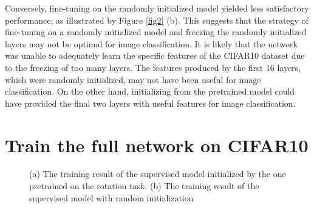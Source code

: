 \documentclass[10pt]{article}
\begin{document}
Conversely, fine-tuning on the randomly initialized model yielded less satisfactory performance, as illustrated by Figure \ref{fig2} (b). This suggests that the strategy of fine-tuning on a randomly initialized model and freezing the randomly initialized layers may not be optimal for image classification. It is likely that the network was unable to adequately learn the specific features of the CIFAR10 dataset due to the freezing of too many layers. The features produced by the first 16 layers, which were randomly initialized, may not have been useful for image classification. On the other hand, initializing from the pretrained model could have provided the final two layers with useful features for image classification.
\section{Train the full network on CIFAR10 \label{sec3}}
\begin{figure}[!h]
    \begin{center}
    \end{center}
    \caption{(a) The training result of the supervised model initialized by the one pretrained on the rotation task. (b) The training result of the supervised model with random initialization}
    \label{fig3}
\end{figure}
\end{document}
